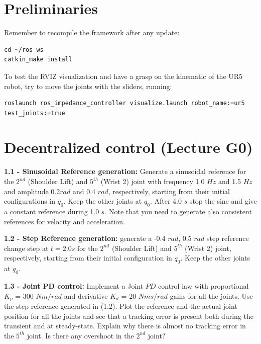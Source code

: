 \documentclass[11pt]{article}
\begin{document}
\section{Preliminaries}

Remember to recompile the framework after any update:

\begin{verbatim}
cd ~/ros_ws
catkin_make install
\end{verbatim}

To test the RVIZ visualization and have a grasp on the kinematic of the UR5 robot, try to move the joints with the sliders, running:
%
\begin{verbatim}
roslaunch ros_impedance_controller visualize.launch robot_name:=ur5 test_joints:=true 
\end{verbatim}

\section{Decentralized control (Lecture G0)}

\noindent
\textbf{1.1 - Sinusoidal Reference generation:}
 Generate a sinusoidal reference for the $2^{nd}$ (Shoulder Lift) and $5^{th}$  (Wrist 2) joint with frequency 1.0 $Hz$ and 1.5 $Hz$ and amplitude 0.2$rad$ and 0.4 $rad$, respectively,  starting from their initial configurations in $q_0$. Keep the other joints at $q_0$. After 4.0 $s$ stop the sine and give a constant reference during  1.0 $s$. Note that you need to generate also consistent references for velocity and acceleration.

\quad

\noindent
\textbf{1.2 - Step Reference generation:} generate a -0.4 $rad$, 0.5 $rad$ step reference change step at $t= 2.0s$ for the $2^{nd}$ (Shoulder Lift) and $5^{th}$  (Wrist 2) joint, respectively, starting from their initial configuration in $q_0$. Keep the other joints at $q_0$.

\quad

\noindent
\textbf{1.3 - Joint PD control:}
Implement a Joint $PD$ control law with proportional $K_p$ = 300 $Nm/rad$ and derivative $K_d$ = 20 $Nms/rad$ gains for all the joints. Use the step reference generated in (1.2). Plot the reference and the actual joint position for all the joints and see that a tracking error is present both during the transient and at steady-state. Explain why there is almost no tracking error in the $5^{th}$ joint. %
Is there any overshoot in the $2^{nd}$ joint? 
\end{document}
